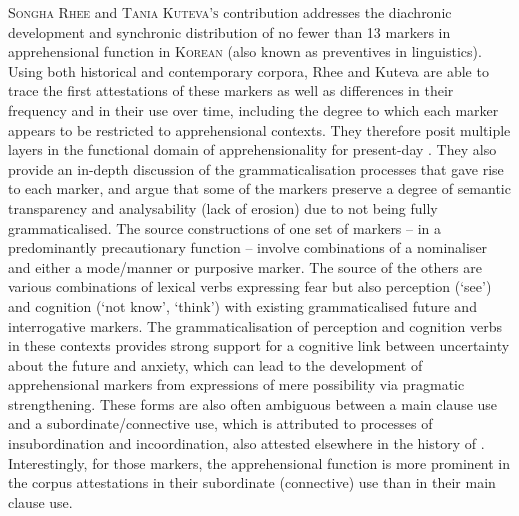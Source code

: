 \documentclass[output=paper,colorlinks,citecolor=brown]{langscibook}
\begin{document}
\textsc{Songha} \textsc{Rhee} and \textsc{Tania} \textsc{Kuteva's} contribution addresses the diachronic development and synchronic distribution of no fewer than 13 markers in apprehensional function in \textsc{Korean} (also known as preventives in  linguistics). Using both historical and contemporary corpora, Rhee and Kuteva are able to trace the first attestations of these markers as well as differences in their frequency and in their use over time, including the degree to which each marker appears to be restricted to apprehensional contexts. They therefore posit multiple layers in the functional domain of apprehensionality for present-day . They also provide an in-depth discussion of the grammaticalisation processes that gave rise to each marker, and argue that some of the markers preserve a degree of semantic transparency and analysability (lack of erosion) due to not being fully grammaticalised. The source constructions of one set of markers – in a predominantly precautionary function – involve combinations of a nominaliser and either a mode/manner or purposive marker. The source of the others are various combinations of lexical verbs expressing fear but also perception (`see') and cognition (`not know', `think') with existing grammaticalised future and interrogative markers. The grammaticalisation of perception and cognition verbs in these contexts provides strong support for a cognitive link between uncertainty about the future and anxiety, which can lead to the development of apprehensional markers from expressions of mere possibility via pragmatic strengthening. These forms are also often ambiguous between a main clause use and a subordinate/connective use, which is attributed to processes of insubordination and incoordination, also attested elsewhere in the history of . Interestingly, for those markers, the apprehensional function is more prominent in the corpus attestations in their subordinate (connective) use than in their main clause use.
\end{document}
